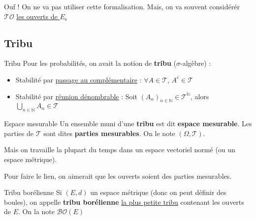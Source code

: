 \begin{note}{}{}
Ouf ! On ne va pas utiliser cette formalisation. Mais, on va souvent considérér $\mathcal{TO}$ \underline{les ouverts de $E$.}
\end{note}



\subsection{Tribu} %
\label{sub:Tribu}

\begin{Definition}[colbacktitle=red!75!black]{Tribu}{}
Pour les probabilités, on avait la notion de \textbf{tribu} ($\sigma$-algèbre) :
\begin{itemize}

    \item Stabilité par \underline{passage au complémentaire} : $\forall A \in \mathcal{T}$, $A ^{c} \in \mathcal{T}$
    \item Stabilité par \underline{réunion dénombrable} : Soit $(A_n) _{n \in \mathbb{N}} \in \mathcal{T} ^{\mathbb{N}}$, alors $\bigcup _{n \in \mathbb{N}} A _n \in \mathcal{T}$

\end{itemize}


\end{Definition}

\begin{Definition}[colbacktitle=red!75!black]{Espace mesurable}{}
Un ensemble muni d'une \textbf{tribu} est dit \textbf{espace mesurable}. Les parties de $\mathcal{T}$ sont dites \textbf{parties mesurables}. On le note $(\Omega, \mathcal{T})$.
\end{Definition}



Mais on travaille la plupart du temps dans un espace vectoriel normé (ou un espace métrique). 

Pour faire le lien, on aimerait que les ouverts soient des parties mesurables. 

\begin{Definition}[colbacktitle=red!75!black]{Tribu borélienne}{}
  Si $(E,d)$ un espace métrique (donc on peut définir des boules), on appelle \textbf{tribu borélienne} \underline{la plus petite tribu} contenant les ouverts de $E$. On la note $\boxed{\mathcal{BO}(E)}$
\end{Definition}


